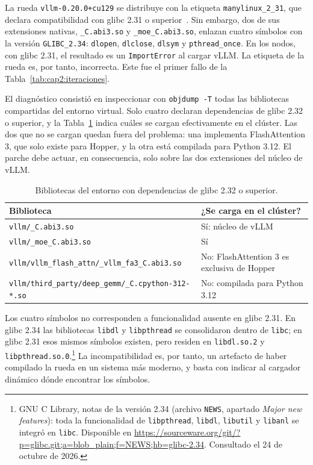 La rueda \texttt{vllm-0.20.0+cu129} se distribuye con la etiqueta \texttt{manylinux\_2\_31}, que declara compatibilidad con glibc 2.31 o superior~\cite{smith2019pep600}. Sin embargo, dos de sus extensiones nativas, \texttt{\_C.abi3.so} y \texttt{\_moe\_C.abi3.so}, enlazan cuatro símbolos con la versión \texttt{GLIBC\_2.34}: \texttt{dlopen}, \texttt{dlclose}, \texttt{dlsym} y \texttt{pthread\_once}. En los nodos, con glibc 2.31, el resultado es un \texttt{ImportError} al cargar vLLM. La etiqueta de la rueda es, por tanto, incorrecta. Este fue el primer fallo de la Tabla~\ref{tab:cap2:iteraciones}.

El diagnóstico consistió en inspeccionar con \texttt{objdump -T} todas las bibliotecas compartidas del entorno virtual. Solo cuatro declaran dependencias de glibc 2.32 o superior, y la Tabla~\ref{tab:cap2:bibliotecas} indica cuáles se cargan efectivamente en el clúster. Las dos que no se cargan quedan fuera del problema: una implementa FlashAttention 3, que solo existe para Hopper, y la otra está compilada para Python 3.12. El parche debe actuar, en consecuencia, solo sobre las dos extensiones del núcleo de vLLM.

\begin{table}[htbp]
  \centering
  \caption{Bibliotecas del entorno con dependencias de glibc 2.32 o superior.}
  \label{tab:cap2:bibliotecas}
  \small
  \begin{tabular}{|p{}|p{}|}
    \hline
    \textbf{Biblioteca} & \textbf{¿Se carga en el clúster?} \\
    \hline
    \texttt{vllm/\_C.abi3.so} & Sí: núcleo de vLLM \\
    \hline
    \texttt{vllm/\_moe\_C.abi3.so} & Sí \\
    \hline
    \texttt{vllm/vllm\_flash\_attn/\allowbreak\_vllm\_fa3\_C.abi3.so} & No: FlashAttention 3 es exclusiva de Hopper \\
    \hline
    \texttt{vllm/third\_party/deep\_gemm/\allowbreak\_C.cpython-312-*.so} & No: compilada para Python 3.12 \\
    \hline
  \end{tabular}
\end{table}

Los cuatro símbolos no corresponden a funcionalidad ausente en glibc 2.31. En glibc 2.34 las bibliotecas \texttt{libdl} y \texttt{libpthread} se consolidaron dentro de \texttt{libc}; en glibc 2.31 esos mismos símbolos existen, pero residen en \texttt{libdl.so.2} y \texttt{libpthread.so.0}.\footnote{GNU C Library, notas de la versión 2.34 (archivo \texttt{NEWS}, apartado \textit{Major new features}): toda la funcionalidad de \texttt{libpthread}, \texttt{libdl}, \texttt{libutil} y \texttt{libanl} se integró en \texttt{libc}. Disponible en \url{https://sourceware.org/git/?p=glibc.git;a=blob_plain;f=NEWS;hb=glibc-2.34}. Consultado el 24 de octubre de 2026.}
La incompatibilidad es, por tanto, un artefacto de haber compilado la rueda en un sistema más moderno, y basta con indicar al cargador dinámico dónde encontrar los símbolos.

